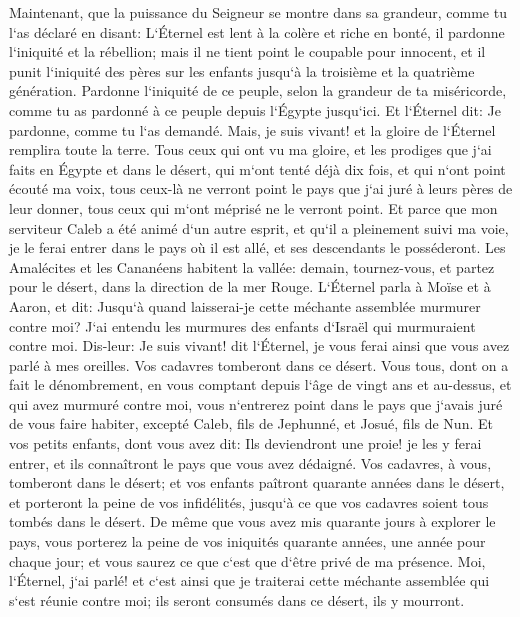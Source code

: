 \verse Maintenant, que la puissance du Seigneur se montre dans sa grandeur, comme tu l`as déclaré en disant: 
\verse L`Éternel est lent à la colère et riche en bonté, il pardonne l`iniquité et la rébellion; mais il ne tient point le coupable pour innocent, et il punit l`iniquité des pères sur les enfants jusqu`à la troisième et la quatrième génération. 
\verse Pardonne l`iniquité de ce peuple, selon la grandeur de ta miséricorde, comme tu as pardonné à ce peuple depuis l`Égypte jusqu`ici. 
\verse Et l`Éternel dit: Je pardonne, comme tu l`as demandé. 
\verse Mais, je suis vivant! et la gloire de l`Éternel remplira toute la terre. 
\verse Tous ceux qui ont vu ma gloire, et les prodiges que j`ai faits en Égypte et dans le désert, qui m`ont tenté déjà dix fois, et qui n`ont point écouté ma voix, 
\verse tous ceux-là ne verront point le pays que j`ai juré à leurs pères de leur donner, tous ceux qui m`ont méprisé ne le verront point. 
\verse Et parce que mon serviteur Caleb a été animé d`un autre esprit, et qu`il a pleinement suivi ma voie, je le ferai entrer dans le pays où il est allé, et ses descendants le posséderont. 
\verse Les Amalécites et les Cananéens habitent la vallée: demain, tournez-vous, et partez pour le désert, dans la direction de la mer Rouge. 
\verse L`Éternel parla à Moïse et à Aaron, et dit: 
\verse Jusqu`à quand laisserai-je cette méchante assemblée murmurer contre moi? J`ai entendu les murmures des enfants d`Israël qui murmuraient contre moi. 
\verse Dis-leur: Je suis vivant! dit l`Éternel, je vous ferai ainsi que vous avez parlé à mes oreilles. 
\verse Vos cadavres tomberont dans ce désert. Vous tous, dont on a fait le dénombrement, en vous comptant depuis l`âge de vingt ans et au-dessus, et qui avez murmuré contre moi, 
\verse vous n`entrerez point dans le pays que j`avais juré de vous faire habiter, excepté Caleb, fils de Jephunné, et Josué, fils de Nun. 
\verse Et vos petits enfants, dont vous avez dit: Ils deviendront une proie! je les y ferai entrer, et ils connaîtront le pays que vous avez dédaigné. 
\verse Vos cadavres, à vous, tomberont dans le désert; 
\verse et vos enfants paîtront quarante années dans le désert, et porteront la peine de vos infidélités, jusqu`à ce que vos cadavres soient tous tombés dans le désert. 
\verse De même que vous avez mis quarante jours à explorer le pays, vous porterez la peine de vos iniquités quarante années, une année pour chaque jour; et vous saurez ce que c`est que d`être privé de ma présence. 
\verse Moi, l`Éternel, j`ai parlé! et c`est ainsi que je traiterai cette méchante assemblée qui s`est réunie contre moi; ils seront consumés dans ce désert, ils y mourront. 

